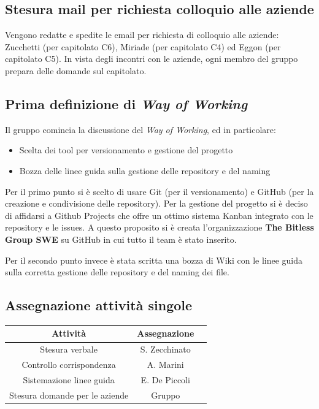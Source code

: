 \documentclass[a4paper, 10pt, colorlinks=true, linkcolor=black, urlcolor=blue, citecolor=blue, hidelinks]{article}
\begin{document}
\subsection{Stesura mail per richiesta colloquio alle aziende}
Vengono redatte e spedite le email per richiesta di colloquio alle aziende: Zucchetti (per capitolato C6), Miriade (per capitolato C4) ed Eggon (per capitolato C5).
In vista degli incontri con le aziende, ogni membro del gruppo prepara delle domande sul capitolato.

\subsection{Prima definizione di \textit{Way of Working}}
Il gruppo comincia la discussione del \textit{Way of Working}, ed in particolare:
\begin{itemize}
    \item Scelta dei tool per versionamento e gestione del progetto
    \item Bozza delle linee guida sulla gestione delle repository e del naming
\end{itemize}
Per il primo punto si è scelto di usare Git (per il versionamento) e GitHub (per la creazione e condivisione delle repository). Per la gestione del progetto si è deciso di affidarsi a Github Projects che offre un ottimo sistema Kanban integrato con le repository e le issues.
A questo proposito si è creata l'organizzazione \textbf{The Bitless Group SWE} su GitHub in cui tutto il team è stato inserito.

Per il secondo punto invece è stata scritta una bozza di Wiki con le linee guida sulla corretta gestione delle repository e del naming dei file.

\subsection{Assegnazione attività singole}
\begin{center}
    \begin{tabular}{|c|c|c|}
        \hline
        \textbf{Attività} & \textbf{Assegnazione} \\
        \hline
        Stesura verbale & S. Zecchinato \\
        \hline
        Controllo corrispondenza & A. Marini \\
        \hline
        Sistemazione linee guida & E. De Piccoli \\
        \hline
        Stesura domande per le aziende & Gruppo \\
        \hline        
    \end{tabular}
\end{center}
\end{document}
